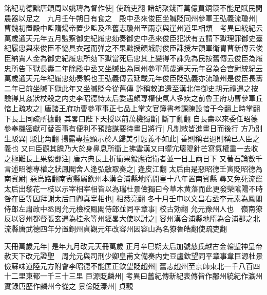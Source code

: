 銘紀功德黜唐頌周以姚璹為督作使|{
	使疏吏翻}
諸胡聚錢百萬億買銅銕不能足賦民間農器以足之　九月壬午朔日有食之　殿中丞來俊臣坐贓貶同州參軍王弘義流瓊州|{
	曹魏初置殿中監隋煬帝置少監及丞舊志瓊州至兩京與崖州道里相類　考異曰統紀云萬歲通天元年五月監察御史紀履忠劾奏御史中丞來俊臣犯狀有五請下獄理罪御史臺紀履忠與來俊臣不恊具衣冠而弹之不果黜授顔城尉俊臣誅授左領軍衛胄曹新傳云俊臣納賈人金為御史紀履忠所劾下獄當死后忠其上變得不誅免為民按舊傳云俊臣為履忠所告下獄長夀二年除殿中丞又坐贓出為同州參軍萬歲通天元年召為合宫尉統紀云萬歲通天元年紀履忠劾奏誤也王弘義傳云延載元年俊臣貶弘義亦流瓊州是俊臣長夀二年已前坐贓下獄此年又坐贓貶今從舊傳}
詐稱敕追還至漢北侍御史胡元禮遇之按驗得其姦狀杖殺之内史李昭德恃太后委遇頗專權使氣人多疾之前魯王府功曹參軍丘愔上疏攻之|{
	唐諸王府功曹參軍事正七品上掌文官簿書考課陳設愔于今翻上時掌翻下長上同疏所據翻}
其畧曰陛下天授以前萬機獨斷|{
	斷丁亂翻}
自長夀以來委任昭德參奉機密獻可替否事有便利不預諮謀要待畫日將行|{
	凡制敕皆進畫日而後行}
方乃别生駁異|{
	駁比角翻}
揚露專擅顯示於人歸美引愆義不如此|{
	善則稱君過則稱已人臣之義也}
又曰臣觀其膽乃大於身鼻息所衝上拂雲漢又曰蠓宂壞隄針芒寫氣權重一去收之極難長上果毅鄧注|{
	唐六典長上折衝果毅應宿衛者並一日上兩日下}
又著石論數千言述昭德專權之狀鳳閣舍人逢弘敏取奏之|{
	逢皮江翻}
太后由是惡昭德壬寅貶昭德為南賓尉|{
	惡烏路翻南賓縣屬欽州本漢合浦縣地隋開皇十八年置南賓縣}
尋又免死流竄　太后出黎花一枝以示宰相宰相皆以為瑞杜景儉獨曰今草木黄落而此更發榮隂陽不時咎在臣等因拜謝太后曰卿真宰相也|{
	相悉亮翻}
冬十月壬申以文昌右丞李元素為鳳閣侍郎左肅政中丞周允元檢校鳳閣侍郎並同平章事|{
	校古効翻}
允元豫州人也　嶺南獠反以容州都督張玄遇為桂永等州經畧大使以討之|{
	容州漢合浦縣地隋為合浦郡之北流縣唐武德四年分置銅州貞觀元年改容州因容山為名獠魯皓翻使疏吏翻}


天冊萬歲元年|{
	是年九月改元天冊萬歲}
正月辛巳朔太后加號慈氏越古金輪聖神皇帝赦天下改元證聖　周允元與司刑少卿皇甫文備奏内史豆盧欽望同平章事韋巨源杜景儉蘇味道陸元方附會李昭德不能匡正欽望貶趙州|{
	舊志趙州至京師東北一千八百四十二里東都一千三十三里}
巨源貶麟州|{
	考異曰舊紀傳新紀表傳皆作鄜州統紀作瀛州實録唐歷作麟州今從之}
景儉貶溱州|{
	貞觀}


